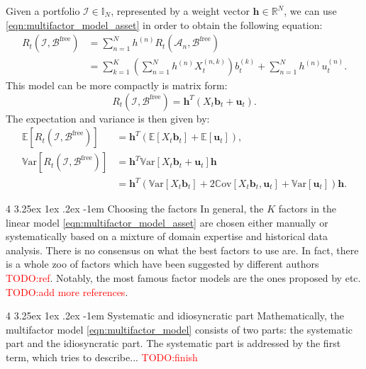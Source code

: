 \documentclass[12pt]{article}
\makeatletter
\renewcommand\paragraph{%
	\@startsection{paragraph}
	{4}
	{\z@}
	{3.25ex \@plus1ex \@minus.2ex}
	{-1em}
	{\normalfont\normalsize\bfseries\maybe@addperiod}%
}
\newcommand{\maybe@addperiod}[1]{%
	#1\@addpunct{.}%
}
\makeatother
\begin{document}
Given a portfolio $\mathcal{I} \in \mathbb{I}_N$, represented by a weight vector $\mathbf{h} \in \mathbb{R}^N$, we can use \eqref{eqn:multifactor_model_asset} in order to obtain the following equation: 
\begin{align}
	R_t(\mathcal{I}, \mathcal{B}^{\text{free}}) 
	&= \sum_{n=1}^N h^{(n)} R_t(\mathcal{A}_n, \mathcal{B}^{\text{free}})
	\\
	&= \sum_{k=1}^K \left(\sum_{n=1}^N h^{(n)} X_t^{(n, k)} \right) b_t^{(k)} + \sum_{n=1}^N h^{(n)} u^{(n)}_t.
	\label{eqn:multifactor_model}
\end{align}
This model can be more compactly is matrix form:
\begin{equation}
	R_t(\mathcal{I}, \mathcal{B}^{\text{free}}) = \mathbf{h}^T (X_t \mathbf{b}_t + \mathbf{u}_t).
\end{equation}
The expectation and variance is then given by:
\begin{align}
	\mathbb{E}[R_t(\mathcal{I}, \mathcal{B}^{\text{free}})] &= \mathbf{h}^T (\mathbb{E}[X_t \mathbf{b}_t] + \mathbb{E}[\mathbf{u}_t]),
	\\
	\mathbb{V}\text{ar}[R_t(\mathcal{I}, \mathcal{B}^{\text{free}})] 
	&= \mathbf{h}^T \mathbb{V}\text{ar}[X_t \mathbf{b}_t + \mathbf{u}_t] \mathbf{h}
	\\
	&= \mathbf{h}^T \left(\mathbb{V}\text{ar}[X_t \mathbf{b}_t] + 2\mathbb{C}\text{ov}[X_t \mathbf{b}_t, \mathbf{u}_t] + \mathbb{V}\text{ar}[\mathbf{u}_t]\right) \mathbf{h}.
\end{align}


\paragraph{Choosing the factors} In general, the $K$ factors in the linear model \eqref{eqn:multifactor_model_asset} are chosen either manually or systematically based on a mixture of domain expertise and historical data analysis. There is no consensus on what the best factors to use are. In fact, there is a whole zoo of factors which have been suggested by different authors \textcolor{red}{TODO:ref}. Notably, the most famous factor models are the ones proposed by \cite{fama1993jofe} etc. \textcolor{red}{TODO:add more references}.

\paragraph{Systematic and idiosyncratic part} Mathematically, the multifactor model \eqref{eqn:multifactor_model} consists of two parts: the systematic part and the idiosyncratic part. The systematic part is addressed by the first term, which tries to describe... \textcolor{red}{TODO:finish}
\end{document}
